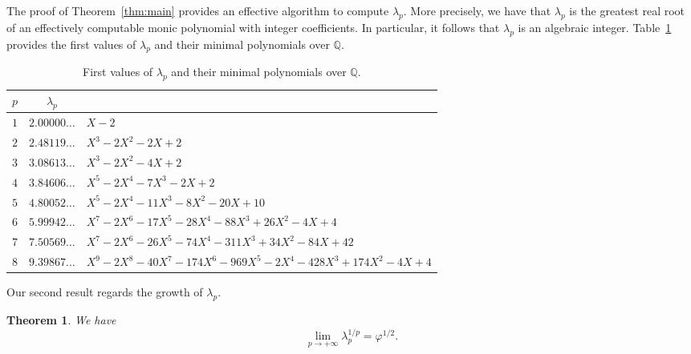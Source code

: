 \documentclass[11pt]{article}
\newtheorem{theorem}{Theorem}[section]
\theoremstyle{remark}\newtheorem{remark}[theorem]{Remark}
\begin{document}
The proof of Theorem~\ref{thm:main} provides an effective algorithm to compute $\lambda_p$.
More precisely, we have that $\lambda_p$ is the greatest real root of an effectively computable monic polynomial with integer coefficients.
In particular, it follows that $\lambda_p$ is an algebraic integer.
Table~\ref{tab:lambda-p} provides the first values of $\lambda_p$ and their minimal polynomials over $\mathbb{Q}$.

\begin{table}[ht]
	\begin{center}
		\begin{tabular}{c@{\hskip 10pt}c@{\hskip 10pt}l@{\hskip 10pt}}
			\toprule
			$p$ & $\lambda_p$ & \text{minimal polynomial of $\lambda_p$ over $\mathbb{Q}$} \\
			\midrule
			$1$ & $2.00000\dots$ & $X - 2$ \\
			$2$ & $2.48119\dots$ & $X^{3} - 2 X^{2} - 2 X + 2$ \\
			$3$ & $3.08613\dots$ & $X^{3} - 2 X^{2} - 4 X + 2$ \\
			$4$ & $3.84606\dots$ & $X^{5} - 2 X^{4} - 7 X^{3} - 2 X + 2$ \\
			$5$ & $4.80052\dots$ & $X^{5} - 2 X^{4} - 11 X^{3} - 8 X^{2} - 20 X + 10$ \\
			$6$ & $5.99942\dots$ & $X^{7} - 2 X^{6} - 17 X^{5} - 28 X^{4} - 88 X^{3} + 26 X^{2} - 4 X + 4$ \\
			$7$ & $7.50569\dots$ & $X^{7} - 2 X^{6} - 26 X^{5} - 74 X^{4} - 311 X^{3} + 34 X^{2} - 84 X + 42$ \\
			$8$ & $9.39867\dots$ & $X^{9} - 2 X^{8} - 40 X^{7} - 174 X^{6} - 969 X^{5} - 2 X^{4} - 428 X^{3} + 174 X^{2} - 4 X + 4$ \\
			\bottomrule
		\end{tabular}
		\vspace{5pt}
	\end{center}
	\caption{First values of $\lambda_p$ and their minimal polynomials over $\mathbb{Q}$.}\label{tab:lambda-p}
\end{table}

Our second result regards the growth of $\lambda_p$.

\begin{theorem}\label{thm:lambda-p}
	We have
	\begin{equation*}
		\lim_{p \to +\infty} \lambda_p^{1/p} = \varphi^{1/2} .
	\end{equation*}
\end{theorem}
\end{document}
